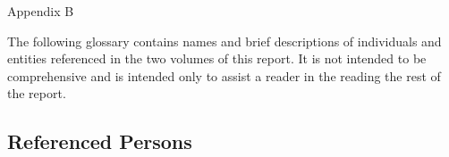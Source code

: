 
\thispagestyle{empty}

\vspace*{15em}

\begin{center}

\Huge
Appendix B

\end{center}

\newpage
The following glossary contains names and brief descriptions of individuals and entities referenced in the two volumes of this report.
It is not intended to be comprehensive and is intended only to assist a reader in the reading the rest of the report.

\subsection{Referenced Persons}

